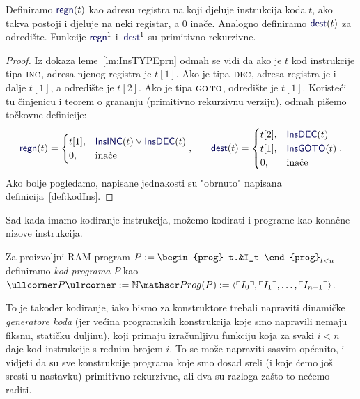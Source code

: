 \begin{lema}[{name=[primitivna rekurzivnost komponenata instrukcije]}]\label{lm:regndestprn}
    Definiramo $\f{regn}(t)$ kao adresu registra na koji djeluje instrukcija koda $t$, ako takva postoji i djeluje na neki registar, a $0$ inače. Analogno definiramo $\f{dest}(t)$ za odredište. Funkcije $\f{regn}^1$ i\, $\f{dest}^1$ su primitivno rekurzivne.
\end{lema}
\begin{proof}
    Iz dokaza leme~\ref{lm:InsTYPEprn} odmah se vidi da ako je $t$ kod instrukcije tipa $\textsc{inc}$, adresa njenog registra je $t[1]$. Ako je tipa $\textsc{dec}$, adresa registra je i dalje $t[1]$, a odredište je $t[2]$. Ako je tipa $\textsc{go\,to}$, odredište je $t[1]$.
    Koristeći tu činjenicu i teorem o grananju (primitivno rekurzivnu verziju), odmah pišemo točkovne definicije:
\begin{equation}
    \f{regn}(t)=\begin{cases}
    t[1],&\f{InsINC}(t)\lor\f{InsDEC}(t)\\
    0,&\text{inače}
    \end{cases}\text,\qquad
    \f{dest}(t)=\begin{cases}
    t[2],&\f{InsDEC}(t)\\
    t[1],&\f{InsGOTO}(t)\\
    0,&\text{inače}
    \end{cases}\text.
\end{equation}
Ako bolje pogledamo, napisane jednakosti su "obrnuto" napisana definicija~\ref{def:kodIns}.
\end{proof}


Sad kada imamo kodiranje instrukcija, možemo kodirati i programe kao konačne nizove instrukcija.

\begin{definicija}[{name=[kodiranje skupa $\mathscr Prog$]}]\label{def:kodProg}
Za proizvoljni RAM-program
$P:=\begin{prog}
t.&I_t
\end{prog}_{t<n}$
definiramo \emph{kod programa} $P$ kao
    $\kprog P:=\N\mathscr Prog(P):=\langle\kins{I_0},\kins{I_1},\dotsc,\kins{I_{n-1}}\rangle$.
\end{definicija}

To je također kodiranje, iako bismo za konstruktore trebali napraviti dinamičke \emph{generatore koda} (jer većina programskih konstrukcija koje smo napravili nemaju fiksnu, statičku duljinu), koji primaju izračunljivu funkciju koja za svaki $i<n$ daje kod instrukcije s rednim brojem $i$. To se može napraviti sasvim općenito, i vidjeti da su sve konstrukcije programa koje smo dosad sreli (i koje ćemo još sresti u nastavku) primitivno rekurzivne, ali dva su razloga zašto to nećemo raditi.

